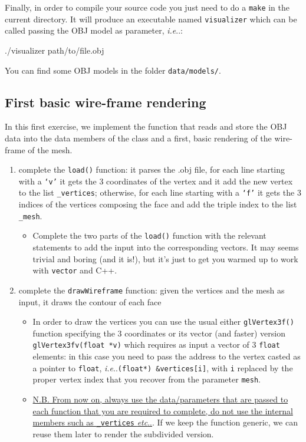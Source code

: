 \documentclass[a4paper,11pt]{article}
\makeatletter
\DeclareRobustCommand\onedot{\futurelet\@let@token\@onedot}
\def\@onedot{\ifx\@let@token.\else.\null\fi\xspace}
\def\ie{\emph{i.e}\onedot} \def\Ie{\emph{I.e}\onedot}
\def\etc{\emph{etc}\onedot} \def\vs{\emph{vs}\onedot}
\newcommand{\hilight}[1]{\colorbox{bg}{#1}}
\newcommand{\coden}[1]{\texttt{#1}}
\newcommand{\code}[1]{\hilight{\texttt{#1}}}
\newcommand{\brand}[1]{\textsf{#1}\xspace}
\makeatother
\begin{document}
Finally, in order to compile your source code you just need to do a \code{make} in the current directory. It will produce an executable named \code{visualizer} which can be called passing the \brand{OBJ} model as parameter, \ie:\\
\begin{bashcode}
./visualizer path/to/file.obj
\end{bashcode}
You can find some \brand{OBJ} models in the folder \code{data/models/}.

\subsection{First basic wire-frame rendering}

In this first exercise, we implement the function that reads and store the \brand{OBJ} data into the data members of the class and a first, basic rendering of the wire-frame of the mesh.

\begin{enumerate}
\item complete the \code{load()} function: it parses the .obj file, for each line starting with a \coden{`v'} it gets the 3 coordinates of the vertex and it add the new vertex to the list \coden{\_vertices}; otherwise, for each line starting with a \coden{`f'} it gets the 3 indices of the vertices composing the face and add the triple index to the list \coden{\_mesh}.
    \begin{itemize}
    \item Complete the two parts of the \coden{load()} function with the relevant statements to add the input into the corresponding vectors. It may seems trivial and boring (and it is!), but it's just to get you warmed up to work with \coden{vector} and \brand{C++}.
    \end{itemize}

\item complete the \code{drawWireframe} function: given the vertices and the mesh as input, it draws the contour of each face
    \begin{itemize}
    \item In order to draw the vertices you can use the usual either \code{glVertex3f()} function specifying the 3 coordinates or its vector (and faster) version \code{glVertex3fv(float *v)} which requires as input a vector of 3 \coden{float} elements: in this case you need to pass the address to the vertex casted as a pointer to \coden{float}, \ie \coden{(float*) \&vertices[i]}, with \coden{i} replaced by the proper vertex index that you recover from the parameter \coden{mesh}.

    \item \uline{N.B. From now on, always use the data/parameters that are passed to each function that you are required to complete, do not use the internal members such as \coden{\_vertices} \etc}. If we keep the function generic, we can reuse them later to render the subdivided version.
    \end{itemize}

\end{enumerate}
\end{document}
